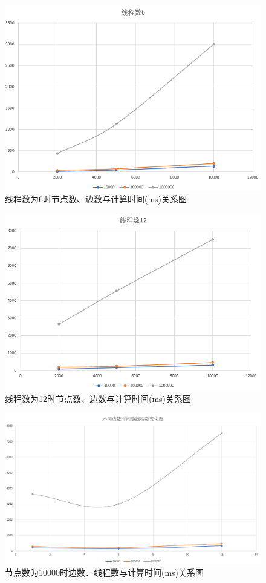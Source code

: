 \documentclass[UTF8]{ctexart}
\begin{document}
\begin{figure}[H]
    \centering
    \includegraphics[scale=0.6]{thread=6.png}
    \caption{线程数为6时节点数、边数与计算时间(ms)关系图}
\end{figure}

\begin{figure}[H]
    \centering
    \includegraphics[scale=0.6]{thread=12.png}
    \caption{线程数为12时节点数、边数与计算时间(ms)关系图}
\end{figure}

\begin{figure}[H]
    \centering
    \includegraphics[scale=0.4]{t-T.png}
    \caption{节点数为10000时边数、线程数与计算时间(ms)关系图}
\end{figure}
\end{document}
